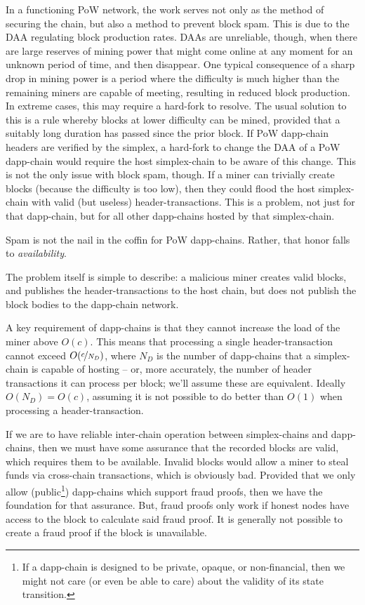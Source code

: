 In a functioning PoW network, the work serves not only as the method of securing the chain, but also a method to prevent block spam.
This is due to the DAA regulating block production rates.
DAAs are unreliable, though, when there are large reserves of mining power that might come online at any moment for an unknown period of time, and then disappear.
One typical consequence of a sharp drop in mining power is a period where the difficulty is much higher than the remaining miners are capable of meeting, resulting in reduced block production.
In extreme cases, this may require a hard-fork to resolve.
The usual solution to this is a rule whereby blocks at lower difficulty can be mined, provided that a suitably long duration has passed since the prior block.
If PoW dapp-chain headers are verified by the simplex, a hard-fork to change the DAA of a PoW dapp-chain would require the host simplex-chain to be aware of this change.
This is not the only issue with block spam, though.
If a miner can trivially create blocks (because the difficulty is too low), then they could flood the host simplex-chain with valid (but useless) header-transactions.
This is a problem, not just for that dapp-chain, but for all other dapp-chains hosted by that simplex-chain.


Spam is not the nail in the coffin for PoW dapp-chains.
Rather, that honor falls to \emph{availability}.

The problem itself is simple to describe: a malicious miner creates valid blocks, and publishes the header-transactions to the host chain, but does not publish the block bodies to the dapp-chain network.

A key requirement of dapp-chains is that they cannot increase the load of the miner above $O(c)$.
This means that processing a single header-transaction cannot exceed $O(\nicefrac{c}{N_D})$, where $N_D$ is the number of dapp-chains that a simplex-chain is capable of hosting -- or, more accurately, the number of header transactions it can process per block; we'll assume these are equivalent.
Ideally $O(N_D) = O(c)$, assuming it is not possible to do better than $O(1)$ when processing a header-transaction.

If we are to have reliable inter-chain operation between simplex-chains and dapp-chains, then we must have some assurance that the recorded blocks are valid, which requires them to be available.
Invalid blocks would allow a miner to steal funds via cross-chain transactions, which is obviously bad.
Provided that we only allow (public\footnote{
  If a dapp-chain is designed to be private, opaque, or non-financial, then we might not care (or even be able to care) about the validity of its state transition.
}) dapp-chains which support fraud proofs, then we have the foundation for that assurance.
But, fraud proofs only work if honest nodes have access to the block to calculate said fraud proof.
It is generally not possible to create a fraud proof if the block is unavailable.


